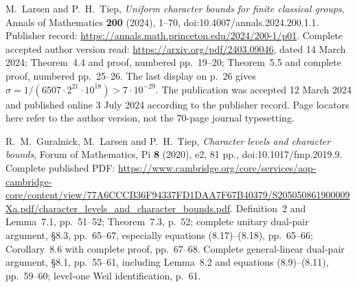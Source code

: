 M.~Larsen and P.~H.~Tiep,
\emph{Uniform character bounds for finite classical groups},
Annals of Mathematics \textbf{200} (2024), 1--70,
doi:10.4007/annals.2024.200.1.1.
Publisher record: \url{https://annals.math.princeton.edu/2024/200-1/p01}.
Complete accepted author version read:
\url{https://arxiv.org/pdf/2403.09046}, dated 14 March 2024;
Theorem~4.4 and proof, numbered pp.~19--20;
Theorem~5.5 and complete proof, numbered pp.~25--26.
The last display on p.~26 gives
$\sigma=1/(6507\cdot2^{21}\cdot10^{18})>7\cdot10^{-29}$.
The publication was accepted 12 March 2024 and published online
3 July 2024 according to the publisher record.  Page locators here
refer to the author version, not the 70-page journal typesetting.

R.~M.~Guralnick, M.~Larsen and P.~H.~Tiep,
\emph{Character levels and character bounds},
Forum of Mathematics, Pi \textbf{8} (2020), e2, 81 pp.,
doi:10.1017/fmp.2019.9.
Complete published PDF:
\url{https://www.cambridge.org/core/services/aop-cambridge-core/content/view/77A6CCCB36F94337FD1DAA7F67B40379/S205050861900009Xa.pdf/character_levels_and_character_bounds.pdf}.
Definition~2 and Lemma~7.1, pp.~51--52; Theorem~7.3, p.~52;
complete unitary dual-pair argument, \S8.3, pp.~65--67,
especially equations (8.17)--(8.18), pp.~65--66;
Corollary~8.6 with complete proof, pp.~67--68.
Complete general-linear dual-pair argument, \S8.1, pp.~55--61,
including Lemma~8.2 and equations (8.9)--(8.11), pp.~59--60;
level-one Weil identification, p.~61.
